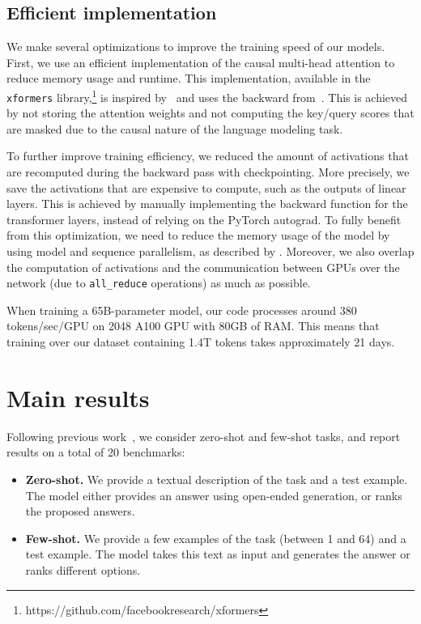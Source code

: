 \subsection{Efficient implementation} We make several optimizations to improve the training speed of our models. First, we use an efficient implementation of the causal multi-head attention to reduce memory usage and runtime. This implementation, available in the \texttt{xformers} library,\footnote{https://github.com/facebookresearch/xformers} is inspired by~\citet{rabe2021self} and uses the backward from~\citet{dao2022flashattention}.
This is achieved by not storing the attention weights and not computing the key/query scores that are masked due to the causal nature of the language modeling task.

To further improve training efficiency, we reduced the amount of activations that are recomputed during the backward pass with checkpointing. More precisely, we save the activations that are expensive to compute, such as the outputs of linear layers. This is achieved by manually implementing the backward function for the transformer layers, instead of relying on the PyTorch autograd. To fully benefit from this optimization, we need to reduce the memory usage of the model by using model and sequence parallelism, as described by \citet{korthikanti2022reducing}. Moreover, we also overlap the computation of activations and the communication between GPUs over the network (due to \texttt{all\_reduce} operations) as much as possible.

When training a 65B-parameter model, our code processes around 380 tokens/sec/GPU on 2048 A100 GPU with 80GB of RAM. This means that training over our dataset containing 1.4T tokens takes approximately 21 days.

\section{Main results} Following previous work~\citep{brown2020gpt3}, we consider zero-shot and few-shot tasks, and report results on a total of 20 benchmarks:

\begin{itemize}
\item\textbf{Zero-shot.}
We provide a textual description of the task and a test example. The model either provides an answer using open-ended generation, or ranks the proposed answers.
\item\textbf{Few-shot.} 
We provide a few examples of the task (between 1 and 64) and a test example. The model takes this text as input and generates the answer or ranks different options.
\end{itemize}

